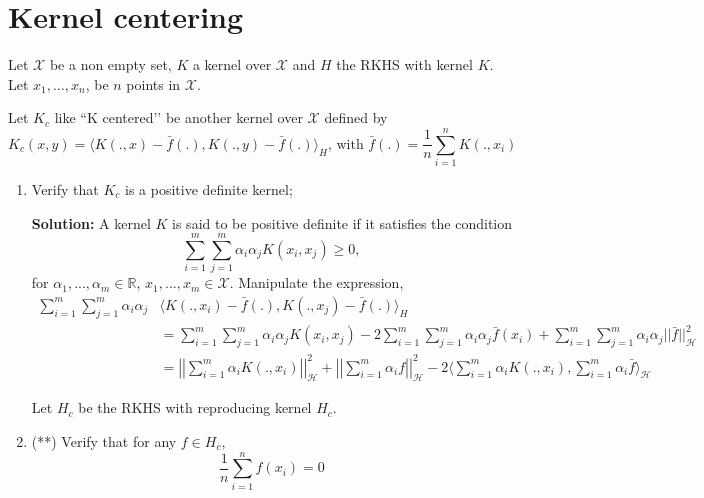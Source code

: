 \documentclass{article}[12pt]
\begin{document}
\section{Kernel centering}
Let $\mathcal{X}$ be a non empty set, $K$ a kernel over $\mathcal{X}$ and $H$ the RKHS with kernel $K$. Let $x_1,\ldots,x_n$, be $n$ points in $\mathcal{X}$. 

Let $K_c$ like ``K centered\rq\rq{} be another kernel over $\mathcal{X}$ defined by 
\begin{equation}
K_c(x,y)=\langle K(.,x)- \bar{f}(.), K(.,y)-\bar{f}(.)\rangle_H \mbox{, with } \bar{f}(.)=\frac{1}{n}\sum_{i=1}^n K(.,x_i)
\end{equation}
\begin{enumerate}
\item Verify that $K_c$ is a positive definite kernel;

	\textbf{Solution:} A kernel $K$ is said to be positive definite if it satisfies the condition \begin{equation}
		\sum^{m}_{i=1} \sum^{m}_{j=1} \alpha_i \alpha_j K(x_i, x_j) \ge 0,  		
\end{equation}
for $\alpha_1,...,\alpha_m \in \mathbb R$, $x_1,...,x_m \in \mathcal X$. Manipulate the expression, 
\begin{equation}
	\begin{aligned}
		\sum^{m}_{i=1} \sum^{m}_{j=1} \alpha_i \alpha_j  &\langle K(.,x_i)- \bar{f}(.), K(.,x_j)-\bar{f}(.)\rangle_H \\ 
		&= \sum^{m}_{i=1} \sum^{m}_{j=1} \alpha_i \alpha_j K(x_i, x_j) - 2 \sum^{m}_{i=1} \sum^{m}_{j=1} \alpha_i \alpha_j \bar f(x_i)  + \sum^{m}_{i=1} \sum^{m}_{j=1} \alpha_i \alpha_j || \bar f ||_{\mathcal H}^2 \\
		&= \left| \left| \sum^{m}_{i=1} \alpha_i K(., x_i)  \right| \right|^2_{\mathcal H} + \left| \left| \sum^{m}_{i=1} \alpha_i f  \right| \right|^2_{\mathcal H} - 2 \langle \sum^{m}_{i=1} \alpha_i K(., x_i), \sum^{m}_{i=1} \alpha_i \bar f  \rangle_{\mathcal H}  
	\end{aligned}
\end{equation}

	
\noindent
Let $H_c$ be the RKHS with reproducing kernel $H_c$. 
\item (**) Verify that for any $f \in H_c$, 
\begin{equation}
\frac{1}{n} \sum_{i=1}^n f(x_i)=0
\end{equation}


\end{enumerate}
\end{document}
